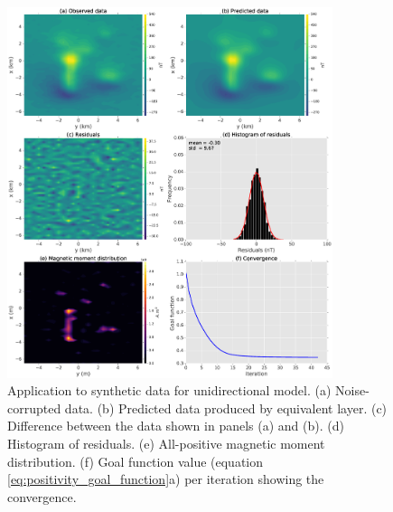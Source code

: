 
\begin{figure}
	\centering
	\includegraphics[width=0.85\textwidth]{Fig/unidir_test/results_compiled_LM_NNLS_magRM.eps}
	\caption{Application to synthetic data for unidirectional model. (a) Noise-corrupted data. (b) Predicted data produced by equivalent layer. (c) Difference between the data shown in panels (a) and (b). (d) Histogram of residuals. (e) All-positive magnetic moment distribution. (f) Goal function value (equation \ref{eq:positivity_goal_function}a) per iteration showing the convergence.}
	\label{fig:unidir_test}
\end{figure}

